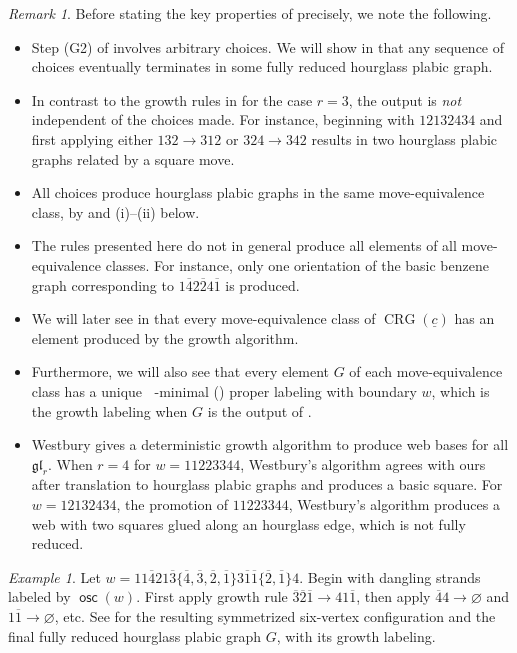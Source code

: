 \documentclass{amsart}
\theoremstyle{definition}
\theoremstyle{remark}
\newtheorem{remark}[theorem]{Remark}
\newtheorem{example}[theorem]{Example}
\numberwithin{equation}{section}
\DeclareMathOperator{\osc}{\mathsf{osc}}
\DeclareMathOperator{\crg}{CRG}
\DeclareMathOperator{\tlex}{l\widetilde{ex}}
\newcommand{\symm}{symmetrized }
\begin{document}
\begin{remark}
Before stating the key properties of  precisely, we note the following.
\begin{itemize}
    \item[---] Step (G2) of  involves arbitrary choices. We will show in  that any sequence of choices eventually terminates in some fully reduced hourglass plabic graph.
    \item[---] In contrast to the growth rules in \cite{Khovanov-Kuperberg} for the case $r=3$, the output is \textit{not} independent of the choices made. For instance, beginning with $12132434$ and first applying either $132 \to 312$ or $324 \to 342$ results in two hourglass plabic graphs related by a square move.
    \item[---] All choices produce hourglass plabic graphs in the same move-equivalence class, by  and (i)--(ii) below.
    \item[---] The rules presented here do not in general produce all elements of all move-equivalence classes. For instance, only one orientation of the basic benzene graph corresponding to $1\overline{4}2\overline{2}4\overline{1}$ is produced.
    \item[---] We will later see in  that every move-equivalence class of $\crg(\underline{c})$ has an element produced by the growth algorithm.
    \item[---] Furthermore, we will also see that every element $G$ of each move-equivalence class has a unique $\tlex$-minimal () proper labeling with boundary $w$, which is the growth labeling when $G$ is the output of .
    \item[---] Westbury \cite{Westbury} gives a deterministic growth algorithm to produce web bases for all $\mathfrak{gl}_r$. When $r=4$ for $w=11223344$, Westbury's algorithm agrees with ours after translation to hourglass plabic graphs and produces a basic square. For $w=12132434$, the promotion of $11223344$, Westbury's algorithm produces a web with two squares glued along an hourglass edge, which is not fully reduced.
\end{itemize}
\end{remark}

\begin{example}\label{ex:growth_figure}
  Let $w = 11\overline{4}21\overline{3}\{\overline{4},\overline{3},\overline{2},\overline{1}\}3\overline{1}\overline{1}\{\overline{2},\overline{1}\}4$. Begin with dangling strands labeled by $\osc(w)$. First apply growth rule $\overline{3}\overline{2}\overline{1} \to 41\overline{1}$, then apply $\overline{4}4 \to \varnothing$ and $1\overline{1} \to \varnothing$, etc. See  for the resulting \symm six-vertex configuration and the final fully reduced hourglass plabic graph $G$, with its growth labeling. 
\end{example}
\end{document}

